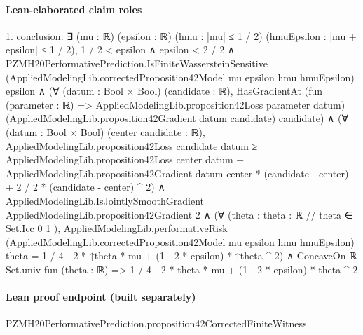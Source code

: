 \documentclass[10pt]{article}
\begin{document}
\paragraph{Lean-elaborated claim roles}\begin{ReviewVerbatim}
1. conclusion: ∃ (mu : ℝ) (epsilon : ℝ) (hmu : |mu| ≤ 1 / 2) (hmuEpsilon : |mu + epsilon| ≤ 1 / 2),
  1 / 2 < epsilon ∧
    epsilon < 2 / 2 ∧
      PZMH20PerformativePrediction.IsFiniteWassersteinSensitive
          (AppliedModelingLib.correctedProposition42Model mu epsilon hmu hmuEpsilon) epsilon ∧
        (∀ (datum : Bool × Bool) (candidate : ℝ),
            HasGradientAt (fun (parameter : ℝ) => AppliedModelingLib.proposition42Loss parameter datum)
              (AppliedModelingLib.proposition42Gradient datum candidate) candidate) ∧
          (∀ (datum : Bool × Bool) (center candidate : ℝ),
              AppliedModelingLib.proposition42Loss candidate datum ≥
                AppliedModelingLib.proposition42Loss center datum +
                    AppliedModelingLib.proposition42Gradient datum center * (candidate - center) +
                  2 / 2 * (candidate - center) ^ 2) ∧
            AppliedModelingLib.IsJointlySmoothGradient AppliedModelingLib.proposition42Gradient 2 ∧
              (∀ (theta : { theta : ℝ // theta ∈ Set.Icc 0 1 }),
                  AppliedModelingLib.performativeRisk
                      (AppliedModelingLib.correctedProposition42Model mu epsilon hmu hmuEpsilon) theta =
                    1 / 4 - 2 * ↑theta * mu + (1 - 2 * epsilon) * ↑theta ^ 2) ∧
                ConcaveOn ℝ Set.univ fun (theta : ℝ) => 1 / 4 - 2 * theta * mu + (1 - 2 * epsilon) * theta ^ 2
\end{ReviewVerbatim}

\paragraph{Lean proof endpoint (built separately)}\begin{ReviewVerbatim}
PZMH20PerformativePrediction.proposition42CorrectedFiniteWitness
\end{ReviewVerbatim}
\end{document}
